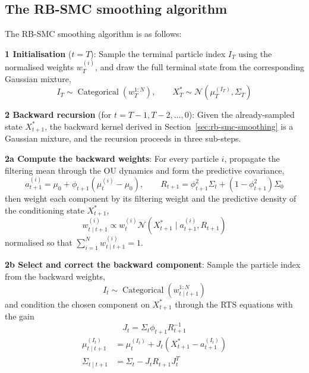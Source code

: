 \subsection{The RB-SMC smoothing algorithm}

The RB-SMC smoothing algorithm is as follows:

\textbf{1 Initialisation} ($t = T$): Sample the terminal particle index $I_T$ using the normalised weights $w_T^{(i)}$, and draw the full terminal state from the corresponding Gaussian mixture,
\begin{equation}
    I_T \sim \operatorname{Categorical}(w_T^{1:N}), \qquad X_T^* \sim \mathcal{N}(\mu_T^{(I_T)}, \Sigma_T) \nonumber
\end{equation}

\textbf{2 Backward recursion} (for $t = T-1, T-2, \dots, 0$): Given the already-sampled state $X_{t+1}^*$, the backward kernel derived in Section~\ref{sec:rb-smc-smoothing} is a Gaussian mixture, and the recursion proceeds in three sub-steps.

\textbf{2a Compute the backward weights}: For every particle $i$, propagate the filtering mean through the OU dynamics and form the predictive covariance,
\begin{equation}
    a_{t+1}^{(i)} = \mu_0 + \phi_{t+1}(\mu_t^{(i)} - \mu_0), \qquad R_{t+1} = \phi_{t+1}^2 \Sigma_t + (1 - \phi_{t+1}^2) \Sigma_0 \nonumber
\end{equation}
then weight each component by its filtering weight and the predictive density of the conditioning state $X_{t+1}^*$,
\begin{equation}
    w_{t \mid t+1}^{(i)} \propto w_t^{(i)} \mathcal{N}\left( X_{t+1}^* \mid a_{t+1}^{(i)}, R_{t+1} \right) \nonumber
\end{equation}
normalised so that $\sum_{i=1}^N w_{t \mid t+1}^{(i)} = 1$.

\textbf{2b Select and correct the backward component}: Sample the particle index from the backward weights,
\begin{equation}
    I_t \sim \operatorname{Categorical}(w_{t \mid t+1}^{1:N}) \nonumber
\end{equation}
and condition the chosen component on $X_{t+1}^*$ through the RTS equations with the gain
\begin{equation}
    J_t = \Sigma_t \phi_{t+1} R_{t+1}^{-1} \nonumber
\end{equation}
\begin{align}
    \mu_{t \mid t+1}^{(I_t)} &= \mu_t^{(I_t)} + J_t \left( X_{t+1}^* - a_{t+1}^{(I_t)} \right) \nonumber \\
    \Sigma_{t \mid t+1} &= \Sigma_t - J_t R_{t+1} J_t^T \nonumber
\end{align}

